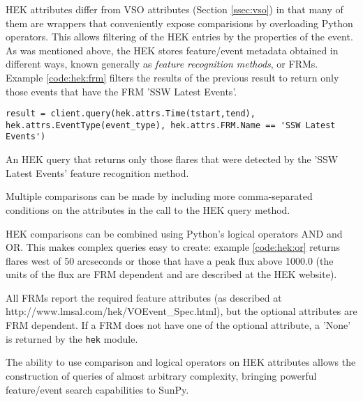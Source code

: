 HEK attributes differ from VSO attributes (Section \ref{ssec:vso}) in
that many of them are wrappers that conveniently expose
comparisions by overloading Python operators.  This allows filtering
of the HEK entries by the properties of the event.  As was mentioned
above, the HEK stores feature/event metadata obtained in different
ways, known generally as {\it feature recognition methods}, or FRMs.
Example \ref{code:hek:frm} filters the results of the previous result
to return only those events that have the FRM 'SSW Latest Events'.
\begin{listing}
\begin{verbatim}
result = client.query(hek.attrs.Time(tstart,tend), hek.attrs.EventType(event_type), hek.attrs.FRM.Name == 'SSW Latest Events')
\end{verbatim}
\caption{An HEK query that returns only those flares that were
  detected by the 'SSW Latest Events' feature recognition method.}
\label{code:hek:frm}
\end{listing}
Multiple comparisons can be made by including more comma-separated
conditions on the attributes in the call to the HEK query method.

HEK comparisons can be combined using Python’s logical operators AND
and OR. This makes complex queries easy to create: example
\ref{code:hek:or} returns flares west of 50 arcseconds or those that
have a peak flux above 1000.0 (the units of the flux are FRM dependent
and are described at the HEK website).
All FRMs report the required feature attributes (as described at
http://www.lmsal.com/hek/VOEvent_Spec.html), but the optional
attributes are FRM dependent.  If a FRM does not have one of the
optional attribute, a 'None' is returned by the \texttt{hek} module.

The ability to use comparison and logical operators on HEK attributes
allows the construction of queries of almost arbitrary complexity,
bringing powerful feature/event search capabilities to SunPy.
